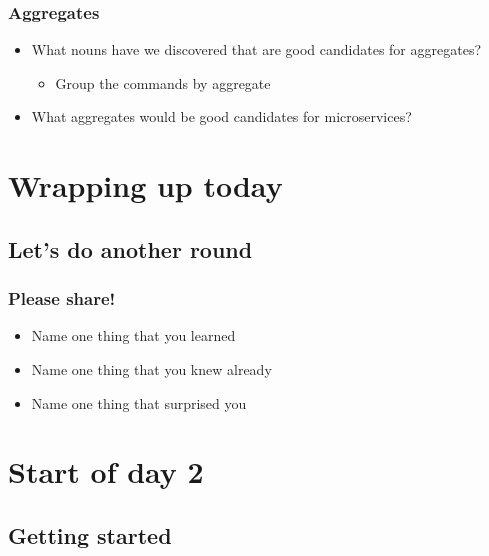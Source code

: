 \documentclass[8pt]{article}
\begin{document}
\subsubsection{Aggregates}
\label{sec:org246ffcc}
\begin{itemize}
\item What nouns have we discovered that are good candidates for aggregates?
\begin{itemize}
\item Group the commands by aggregate
\end{itemize}

\item What aggregates would be good candidates for microservices?
\end{itemize}
\section{Wrapping up today}
\label{sec:org2571560}
\subsection{Let's do another round}
\label{sec:orgb258a24}
\subsubsection{Please share!}
\label{sec:org9a4489b}
\begin{itemize}
\item Name one thing that you learned
\item Name one thing that you knew already
\item Name one thing that surprised you
\end{itemize}
\section{Start of day 2}
\label{sec:orged0daa5}
\subsection{Getting started}
\label{sec:orgc802e68}
\end{document}
